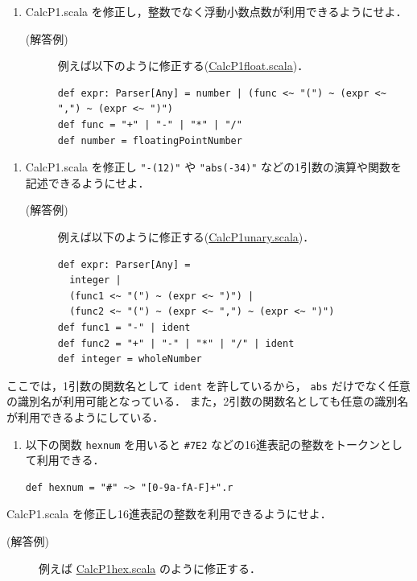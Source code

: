 \documentclass[a4j]{jsarticle}
\begin{document}
\begin{enumerate}
\item CalcP1.scala を修正し，整数でなく浮動小数点数が利用できるようにせよ．
\begin{description}
\item[(解答例)] 例えば以下のように修正する(\href{file:///home/tamura/lect2/ProLang/2018/org/prog/parser/CalcP1float.scala}{CalcP1float.scala})．

\begin{verbatim}
def expr: Parser[Any] = number | (func <~ "(") ~ (expr <~ ",") ~ (expr <~ ")")
def func = "+" | "-" | "*" | "/"
def number = floatingPointNumber
\end{verbatim}
\end{description}
\end{enumerate}
\begin{enumerate}
\item CalcP1.scala を修正し \texttt{"-(12)"} や \texttt{"abs(-34)"} などの1引数の演算や関数を記述できるようにせよ．
\begin{description}
\item[(解答例)] 例えば以下のように修正する(\href{file:///home/tamura/lect2/ProLang/2018/org/prog/parser/CalcP1unary.scala}{CalcP1unary.scala})．

\begin{verbatim}
def expr: Parser[Any] =
  integer |
  (func1 <~ "(") ~ (expr <~ ")") |
  (func2 <~ "(") ~ (expr <~ ",") ~ (expr <~ ")")
def func1 = "-" | ident
def func2 = "+" | "-" | "*" | "/" | ident
def integer = wholeNumber
\end{verbatim}
\end{description}
\end{enumerate}
       ここでは，1引数の関数名として \texttt{ident} を許しているから，
       \texttt{abs} だけでなく任意の識別名が利用可能となっている．
       また，2引数の関数名としても任意の識別名が利用できるようにしている．
\begin{enumerate}
\item 以下の関数 \texttt{hexnum} を用いると \texttt{\#7E2} などの16進表記の整数をトークンとして利用できる．

\begin{verbatim}
def hexnum = "#" ~> "[0-9a-fA-F]+".r
\end{verbatim}
\end{enumerate}
     CalcP1.scala を修正し16進表記の整数を利用できるようにせよ．
\begin{description}
\item[(解答例)] 例えば \href{file:///home/tamura/lect2/ProLang/2018/org/prog/parser/CalcP1hex.scala}{CalcP1hex.scala} のように修正する．
\end{description}
\end{document}

